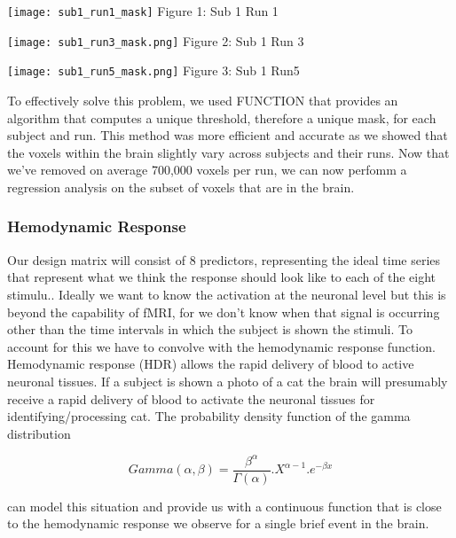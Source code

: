 \documentclass[12pt]{article}
\begin{document}
    \centering
      \texttt{[image: sub1\_run1\_mask]}
Figure 1: Sub 1 Run 1



    \centering
      \texttt{[image: sub1\_run3\_mask.png]}
Figure 2: Sub 1 Run 3



    \centering
      \texttt{[image: sub1\_run5\_mask.png]}
Figure 3: Sub 1 Run5



To effectively solve this problem, we used FUNCTION that provides an algorithm 
that computes a unique threshold, therefore a unique mask, for each subject and 
run. This method was more efficient and accurate as we showed that the voxels 
within the brain slightly vary  across subjects and their runs. Now that we've removed on average 700,000 voxels per run, 
we can now perfomm a regression analysis on the subset of voxels that are in 
the brain.    
          
\subsubsection{Hemodynamic Response}

Our design matrix will consist of 8 predictors, representing the ideal time series 
that represent what we think the response should look like to each of the eight 
stimulu.. Ideally we want to know the activation at the neuronal level but 
this is beyond the capability of fMRI, for we don’t know when that signal 
is occurring other than the time intervals in which the subject is shown the 
stimuli. To account for this we have to convolve with the hemodynamic response 
function. Hemodynamic response (HDR) allows the rapid delivery of blood to 
active neuronal tissues. If a subject is shown a photo of a cat the brain will 
presumably receive a rapid delivery of blood to activate the neuronal tissues 
for identifying/processing cat. The probability density function of the gamma 
distribution
  
\begin{equation}
    Gamma(\alpha ,\beta )= \frac{\beta ^{\alpha }}{\Gamma (\alpha )}.X^{\alpha -1}.e^{-\beta x}
\end{equation}
           

can model this situation and provide us with a continuous function that is 
close to the hemodynamic response we observe for a single brief event in the 
brain.
\end{document}

